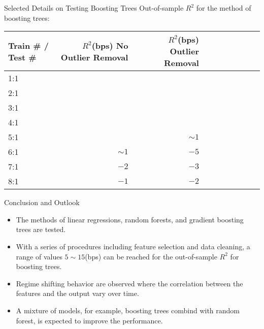 \documentclass{beamer}
\begin{document}
\begin{frame}{Selected Details on Testing Boosting Trees}
Out-of-sample $R^2$ for the method of boosting trees:
\vspace{10 mm}
\small
	\begin{tabular}{lrrrrrrrrr}  
		\toprule
		Train \# / Test \# & $R^2$(bps) No Outlier Removal &  $R^2$(bps) Outlier Removal \\
		\midrule
	    1:1 & \color{red}{$+3$}	& \color{red}{$+4$}	 \\
	    2:1 & \color{red}{$+4$}	& \color{red}{$+5$}	 \\
	    3:1 & \color{red}{$+15$}	& \color{red}{$+13$}	 \\
	    4:1 & \color{red}{$+15$}	& \color{red}{$+13$}	 \\
	    5:1 & \color{red}{$+7$}	& $\sim 1$	 \\
	    6:1 & $\sim 1$	& $-5$	 \\
	    7:1 & $-2$	& $-3$	 \\
	    8:1 & $-1$	& $-2$	 \\
		\bottomrule
	\end{tabular}
\end{frame}

\begin{frame}{Conclusion and Outlook}
\begin{itemize}
\item The methods of linear regressions, random forests, and gradient boosting trees are tested.
\item With a series of procedures including feature selection and data cleaning, a range of values $5\sim 15$(bps) can be reached for the out-of-sample $R^2$ for boosting trees.
\item Regime shifting behavior are observed where the correlation between the features and the output vary over time.
\item A mixture of models, for example, boosting trees combind with random forest, is expected to improve the performance.
\end{itemize}

\end{frame}
\end{document}
